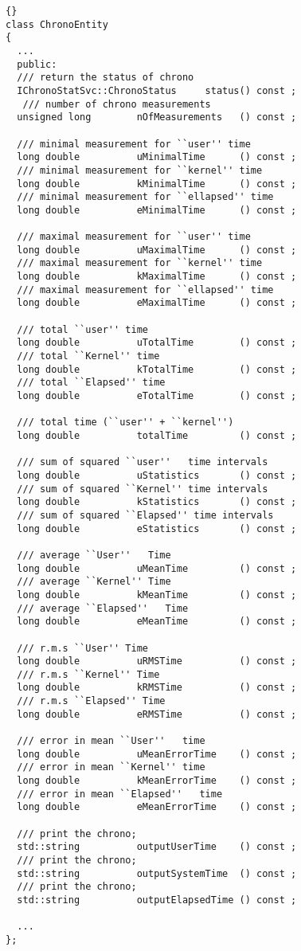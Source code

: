 \documentclass{lhcbnote}
\begin{document}
\begin{lstlisting}{}
class ChronoEntity 
{
  ...
  public:
  /// return the status of chrono
  IChronoStatSvc::ChronoStatus     status() const ;
   /// number of chrono measurements
  unsigned long        nOfMeasurements   () const ;

  /// minimal measurement for ``user'' time
  long double          uMinimalTime      () const ;
  /// minimal measurement for ``kernel'' time
  long double          kMinimalTime      () const ;
  /// minimal measurement for ``ellapsed'' time
  long double          eMinimalTime      () const ;

  /// maximal measurement for ``user'' time
  long double          uMaximalTime      () const ;
  /// maximal measurement for ``kernel'' time
  long double          kMaximalTime      () const ; 
  /// maximal measurement for ``ellapsed'' time
  long double          eMaximalTime      () const ;

  /// total ``user'' time
  long double          uTotalTime        () const ;
  /// total ``Kernel'' time
  long double          kTotalTime        () const ;
  /// total ``Elapsed'' time
  long double          eTotalTime        () const ;

  /// total time (``user'' + ``kernel'') 
  long double          totalTime         () const ;

  /// sum of squared ``user''   time intervals
  long double          uStatistics       () const ;
  /// sum of squared ``Kernel'' time intervals
  long double          kStatistics       () const ;
  /// sum of squared ``Elapsed'' time intervals
  long double          eStatistics       () const ;
  
  /// average ``User''   Time
  long double          uMeanTime         () const ;
  /// average ``Kernel'' Time
  long double          kMeanTime         () const ;
  /// average ``Elapsed''   Time
  long double          eMeanTime         () const ;

  /// r.m.s ``User'' Time
  long double          uRMSTime          () const ;
  /// r.m.s ``Kernel'' Time
  long double          kRMSTime          () const ;
  /// r.m.s ``Elapsed'' Time
  long double          eRMSTime          () const ;

  /// error in mean ``User''   time
  long double          uMeanErrorTime    () const ;
  /// error in mean ``Kernel'' time
  long double          kMeanErrorTime    () const ;
  /// error in mean ``Elapsed''   time
  long double          eMeanErrorTime    () const ;
  
  /// print the chrono;
  std::string          outputUserTime    () const ; 
  /// print the chrono;
  std::string          outputSystemTime  () const ; 
  /// print the chrono;
  std::string          outputElapsedTime () const ;

  ...
};
\end{lstlisting} 
\end{document}

